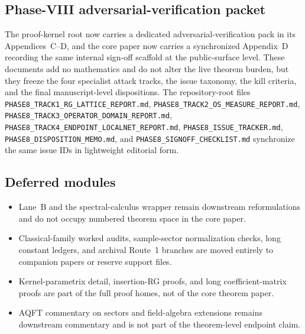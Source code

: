 \subsection*{Phase-VIII adversarial-verification packet}
The proof-kernel root now carries a dedicated adversarial-verification pack in its Appendices~C--D, and the core paper now carries a synchronized Appendix~D recording the same internal sign-off scaffold at the public-surface level. These documents add no mathematics and do not alter the live theorem burden, but they freeze the four specialist attack tracks, the issue taxonomy, the kill criteria, and the final manuscript-level dispositions. The repository-root files \texttt{PHASE8\_TRACK1\_RG\_LATTICE\_REPORT.md}, \texttt{PHASE8\_TRACK2\_OS\_MEASURE\_REPORT.md}, \texttt{PHASE8\_TRACK3\_OPERATOR\_DOMAIN\_REPORT.md}, \texttt{PHASE8\_TRACK4\_ENDPOINT\_LOCALNET\_REPORT.md}, \texttt{PHASE8\_ISSUE\_TRACKER.md}, \texttt{PHASE8\_DISPOSITION\_MEMO.md}, and \texttt{PHASE8\_SIGNOFF\_CHECKLIST.md} synchronize the same issue IDs in lightweight editorial form.

\subsection*{Deferred modules}
\begin{itemize}
    \item Lane~B and the spectral-calculus wrapper remain downstream reformulations and do not occupy numbered theorem space in the core paper.
    \item Classical-family worked audits, sample-sector normalization checks, long constant ledgers, and archival Route~1 branches are moved entirely to companion papers or reserve support files.
    \item Kernel-parametrix detail, insertion-RG proofs, and long coefficient-matrix proofs are part of the full proof homes, not of the core theorem paper.
    \item AQFT commentary on sectors and field-algebra extensions remains downstream commentary and is not part of the theorem-level endpoint claim.
\end{itemize}

